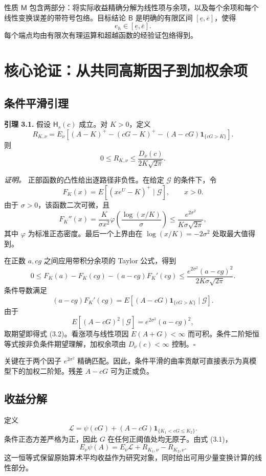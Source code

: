 性质 \(\mathsf M\) 包含两部分：将实际收益精确分解为线性项与余项，以及每个余项和每个线性变换误差的带符号包络。目标结论 \(\mathsf B\) 是明确的有限区间 \([\underline e,\overline e]\)，使得
\[
e_h\in[\underline e,\overline e].
\tag{2.8}
\]
每个端点均由有限次有理运算和超越函数的经验证包络得到。

\section{核心论证：从共同高斯因子到加权余项}

\subsection{条件平滑引理}

\textbf{引理 3.1.} 假设 \(\mathsf H_s(c)\) 成立。对 \(K>0\)，定义
\[
R_{K,\nu}=E_\nu\!\left[(A-K)^+-(cG-K)^+
-(A-cG)\mathbf1_{\{cG>K\}}\right].
\tag{3.1}
\]
则
\[
0\le R_{K,\nu}\le \frac{D_\nu(c)}{2K\sqrt{2\pi}}.
\tag{3.2}
\]

\textit{证明。} 正部函数的凸性给出逐路径非负性。在给定 \(\mathcal G\) 的条件下，令
\[
F_K(x)=E[(xe^U-K)^+\mid\mathcal G],\qquad x>0.
\]
由于 \(\sigma>0\)，该函数二次可微，且
\[
F_K''(x)=\frac{K}{\sigma x^2}
\varphi\!\left(\frac{\log(x/K)}{\sigma}\right)
\le\frac{e^{2\sigma^2}}{K\sigma\sqrt{2\pi}},
\tag{3.3}
\]
其中 \(\varphi\) 为标准正态密度。最后一个上界由在
\(\log(x/K)=-2\sigma^2\)
处取最大值得到。

在正数 \(a,cg\) 之间应用带积分余项的 Taylor 公式，得到
\[
0\le F_K(a)-F_K(cg)-(a-cg)F_K'(cg)
\le \frac{e^{2\sigma^2}(a-cg)^2}{2K\sigma\sqrt{2\pi}}.
\]
条件导数满足
\[
(a-cg)F_K'(cg)
=E[(A-cG)\mathbf1_{\{cG>K\}}\mid\mathcal G].
\]
由于
\[
E[(A-cG)^2\mid\mathcal G]=e^{2\sigma^2}(a-cg)^2,
\]
取期望即得式 (3.2)。看涨项与线性项因 \(E(A+G)<\infty\) 而可积。条件二阶矩恒等式按非负条件期望理解，加权余项由 \(D_\nu(c)<\infty\) 控制。\hfill\(\square\)

关键在于两个因子 \(e^{2\sigma^2}\) 精确匹配。因此，条件平滑的曲率贡献可直接表示为真模型下的加权二阶矩。残差 \(A-cG\) 可为正或负。

\subsection{收益分解}

定义
\[
\mathcal L=\psi(cG)+(A-cG)\mathbf1_{\{K_1<cG\le K_2\}}.
\tag{3.4}
\]
条件正态方差严格为正，因此 \(G\) 在任何正阈值处均无原子。由式 (3.1)，
\[
E_\nu\psi(A)=E_\nu\mathcal L+R_{K_1,\nu}-R_{K_2,\nu}.
\tag{3.5}
\]
这一恒等式保留原始算术平均收益作为研究对象，同时给出可用少量变换计算的线性部分。

